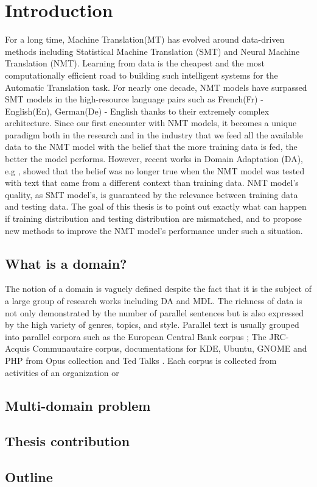 \chapter{Introduction}

For a long time, Machine Translation(MT) has evolved around data-driven methods including Statistical Machine Translation (SMT) and Neural Machine Translation (NMT). Learning from data is the cheapest and the most computationally efficient road to building such intelligent systems for the Automatic Translation task. For nearly one decade, NMT models have surpassed SMT models in the high-resource language pairs such as French(Fr) - English(En), German(De) - English thanks to their extremely complex architecture. Since our first encounter with NMT models, it becomes a unique paradigm both in the research and in the industry that we feed all the available data to the NMT model with the belief that the more training data is fed, the better the model performs. However, recent works in Domain Adaptation (DA), e.g \cite{rico13domain}, showed that the belief was no longer true when the NMT model was tested with text that came from a different context than training data. NMT model's quality, as SMT model's, is guaranteed by the relevance between training data and testing data. The goal of this thesis is to point out exactly what can happen if training distribution and testing distribution are mismatched, and to propose new methods to improve the NMT model's performance under such a situation.

\section{What is a domain?}
The notion of a domain is vaguely defined despite the fact that it is the subject of a large group of research works including DA and MDL. 
The richness of data is not only demonstrated by the number of parallel sentences but is also expressed by the high variety of genres, topics, and style. Parallel text is usually grouped into parallel corpora such as the European Central Bank corpus \citep{Tiedemann12parallel}; The JRC-Acquis Communautaire corpus\citep{Steinberger06acquis}, documentations for KDE, Ubuntu, GNOME and PHP from Opus collection \citep{Tiedemann09news}and Ted Talks \citep{Cettolo12wit}. Each corpus is collected from activities of an organization or 

\section{Multi-domain problem}

\section{Thesis contribution}

\section{Outline}